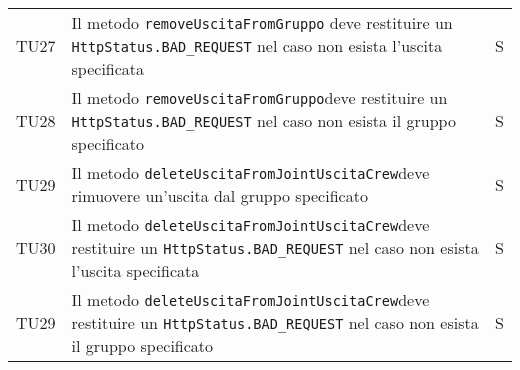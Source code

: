 \begin{center}
{\begin{longtable}{
        |>{\centering\arraybackslash}p{48pt}
        |>{\centering\arraybackslash}p{308pt}
        |>{\centering\arraybackslash}p{27pt}|}
        TU27               & Il metodo \texttt{removeUscitaFromGruppo} deve restituire un \texttt{HttpStatus.BAD\_REQUEST} nel caso non esista l'uscita specificata    & S \\
        TU28               & Il metodo \texttt{removeUscitaFromGruppo}deve restituire un \texttt{HttpStatus.BAD\_REQUEST} nel caso non esista il gruppo specificato    & S \\
        TU29               & Il metodo \texttt{deleteUscitaFromJointUscitaCrew}deve rimuovere un'uscita dal gruppo specificato    & S \\
        TU30               & Il metodo \texttt{deleteUscitaFromJointUscitaCrew}deve restituire un \texttt{HttpStatus.BAD\_REQUEST} nel caso non esista l'uscita specificata   & S \\
        TU29               & Il metodo \texttt{deleteUscitaFromJointUscitaCrew}deve restituire un \texttt{HttpStatus.BAD\_REQUEST} nel caso non esista il gruppo specificato    & S \\
        
        
        
        
      \end{longtable}
    }
  \end{center}
